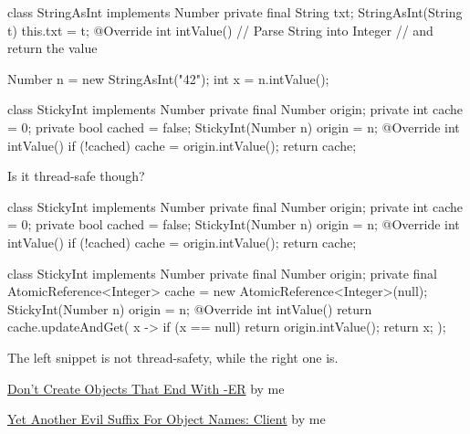 \documentclass{article}
\begin{document}

\begin{pptWide}{2}
{\small\begin{ffcode}
class StringAsInt implements Number {
  private final String txt;
  StringAsInt(String t) { this.txt = t; }
  @Override int intValue() {
    // Parse String into Integer
    // and return the value
  }
}

Number n = new StringAsInt("42");
int x = n.intValue();
\end{ffcode}
}
\par\columnbreak\par
{\small\begin{ffcode}
class StickyInt implements Number {
  private final Number origin;
  private int cache = 0;
  private bool cached = false;
  StickyInt(Number n) { origin = n; }
  @Override int intValue() {
    if (!cached) {
      cache = origin.intValue();
    }
    return cache;
  }
}
\end{ffcode}
}
\end{pptWide}
\par
Is it thread-safe though?
\plush{}

\begin{pptWide}{2}
{\small\begin{ffcode}
class StickyInt implements Number {
  private final Number origin;
  private int cache = 0;
  private bool cached = false;
  StickyInt(Number n) { origin = n; }
  @Override int intValue() {
    if (!cached) {
      cache = origin.intValue();
    }
    return cache;
  }
}
\end{ffcode}
}
\par\columnbreak\par
{\scriptsize\begin{ffcode}
class StickyInt implements Number {
  private final Number origin;
  private final AtomicReference<Integer> cache =
    new AtomicReference<Integer>(null);
  StickyInt(Number n) { origin = n; }
  @Override int intValue() {
    return cache.updateAndGet(
      x -> {
        if (x == null) {
          return origin.intValue();
        }
        return x;
      }
    );
  }
}
\end{ffcode}
}
\end{pptWide}
\par
The left snippet is not thread-safety, while the right one is.
\plush{}


\href{https://www.yegor256.com/2015/03/09/objects-end-with-er.html}{Don't Create Objects That End With -ER} by me

\href{https://www.yegor256.com/2017/09/12/evil-object-name-suffix-client.html}{Yet Another Evil Suffix For Object Names: Client} by me
\end{document}
